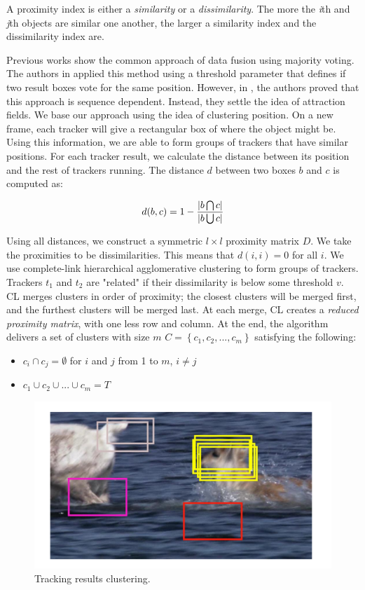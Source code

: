 A proximity index is either a \textit{similarity} or a \textit{dissimilarity}. The more the \textit{i}th and \textit{j}th objects are similar one another, the larger a similarity index and the dissimilarity index are.

Previous works show the common approach of data fusion using majority voting. The authors in \cite{Bailer2013} applied this method using a threshold parameter that defines if two result boxes vote for the same position. However, in \cite{Bailer2014}, the authors proved that this approach is sequence dependent. Instead, they settle the idea of attraction fields. We base our approach using the idea of clustering position. On a new frame, each tracker will give a rectangular box of where the object might be. Using this information, we are able to form groups of trackers that have similar positions. For each tracker result, we calculate the distance between its position and the rest of trackers running. The distance $d$ between two boxes $b$ and $c$ is computed as:

\begin{equation}
\large
d(b,c) = 1 - \frac{|b \bigcap c|}{|b \bigcup  c|}
\end{equation}

Using all distances, we construct a symmetric $l \times l$ proximity matrix $D$. We take the proximities to be dissimilarities. This means that $d(i,i) = 0$ for all $i$. We use complete-link hierarchical agglomerative clustering to form groups of trackers. Trackers $t_1$ and $t_2$ are "related" if their dissimilarity is below some threshold $v$. CL merges clusters in order of proximity; the closest clusters will be merged first, and the furthest clusters will be merged last. At each merge, CL creates a \textit{reduced proximity matrix}, with one less row and column. At the end, the algorithm delivers a set of clusters with size $m$ $C = \left \{ c_1, c_2, ..., c_m \right \}$ satisfying the following:
\begin{itemize}
\item $c_i \cap c_j = \emptyset$ for $i$ and $j$ from 1 to $m$, $i \neq j$
\item $c_1 \cup c_2 \cup ... \cup c_m = T$
\end{itemize}

\begin{figure}[t!]
	\centering
		\includegraphics[width=0.65\linewidth, trim= 1cm 1cm 1cm 1cm, clip=true]{Figures/trackers_clustering.pdf}
	\caption{Tracking results clustering.}
	\label{fig::trackers_clustering}
\end{figure}


